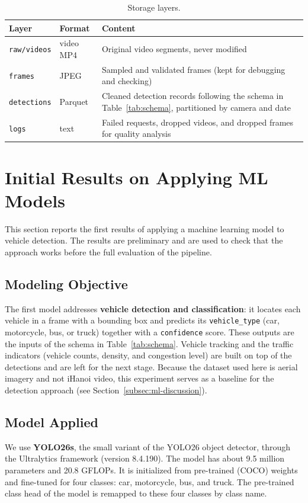 \documentclass[12pt,a4paper]{article}
\begin{document}
\begin{table}[H]
\centering
\caption{Storage layers.}
\label{tab:storage}
\begin{tabularx}{\textwidth}{@{}l l X@{}}
\toprule
\textbf{Layer} & \textbf{Format} & \textbf{Content} \\
\midrule
\texttt{raw/videos}  & video MP4 & Original video segments, never modified \\
\texttt{frames}      & JPEG & Sampled and validated frames (kept for debugging and checking) \\
\texttt{detections}  & Parquet & Cleaned detection records following the schema in Table~\ref{tab:schema}, partitioned by camera and date \\
\texttt{logs}        & text & Failed requests, dropped videos, and dropped frames for quality analysis \\
\bottomrule
\end{tabularx}
\end{table}

\section{Initial Results on Applying ML Models}
\label{sec:ml}

This section reports the first results of applying a machine learning model to
vehicle detection. The results are preliminary and are used to check that the
approach works before the full evaluation of the pipeline.

\subsection{Modeling Objective}
\label{subsec:ml-objective}
The first model addresses \textbf{vehicle detection and classification}: it
locates each vehicle in a frame with a bounding box and predicts its
\texttt{vehicle\_type} (car, motorcycle, bus, or truck) together with a
\texttt{confidence} score. These outputs are the inputs of the schema in
Table~\ref{tab:schema}. Vehicle tracking and the traffic indicators (vehicle
counts, density, and congestion level) are built on top of the detections and
are left for the next stage. Because the dataset used here is aerial imagery
and not iHanoi video, this experiment serves as a baseline for the detection
approach (see Section~\ref{subsec:ml-discussion}).

\subsection{Model Applied}
\label{subsec:ml-models}
We use \textbf{YOLO26s}, the small variant of the YOLO26 object detector, through
the Ultralytics framework (version 8.4.190). The model has about 9.5 million
parameters and 20.8 GFLOPs. It is initialized from pre-trained (COCO) weights
and fine-tuned for four classes: car, motorcycle, bus, and truck. The
pre-trained class head of the model is remapped to these four classes by class
name.
\end{document}
